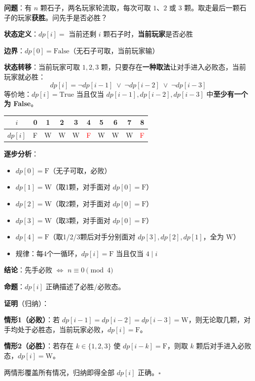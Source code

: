 \documentclass[12pt, a4paper]{ctexart}
\begin{document}
\begin{blackboard}

\textbf{问题}：有 $n$ 颗石子，两名玩家轮流取，每次可取 $1$、$2$ 或 $3$ 颗。取走最后一颗石子的玩家\textbf{获胜}。问先手是否必胜？

\textbf{状态定义}：$dp[i] = $ 当前还剩 $i$ 颗石子时，\textbf{当前玩家}是否必胜

\textbf{边界}：$dp[0] = \text{False}$（无石子可取，当前玩家输）

\textbf{状态转移}：当前玩家可取 $1, 2, 3$ 颗，只要存在\textbf{一种取法}让对手进入必败态，当前玩家就必胜：
\[
dp[i] = \lnot dp[i-1] \;\lor\; \lnot dp[i-2] \;\lor\; \lnot dp[i-3]
\]
等价地：$dp[i] = \text{True}$ 当且仅当 $dp[i-1], dp[i-2], dp[i-3]$ 中\textbf{至少有一个为 False}。

\end{blackboard}

\begin{blackboard}

\begin{center}
\begin{tabular}{c|ccccccccc}
$i$ & 0 & 1 & 2 & 3 & 4 & 5 & 6 & 7 & 8 \\
\hline
$dp[i]$ & F & W & W & W & \textcolor{red}{F} & W & W & W & \textcolor{red}{F} \\
\end{tabular}
\end{center}

\textbf{逐步分析}：
\begin{itemize}
    \item $dp[0] = \text{F}$（无子可取，必败）
    \item $dp[1] = \text{W}$（取1颗，对手面对 $dp[0]=\text{F}$）
    \item $dp[2] = \text{W}$（取2颗，对手面对 $dp[0]=\text{F}$）
    \item $dp[3] = \text{W}$（取3颗，对手面对 $dp[0]=\text{F}$）
    \item $dp[4] = \text{F}$（取1/2/3颗后对手分别面对 $dp[3],dp[2],dp[1]$，全为 W）
    \item 规律：每4个一循环，$dp[i] = \text{F}$ 当且仅当 $4 \mid i$
\end{itemize}

\textbf{结论}：先手必败 $\Longleftrightarrow$ $n \equiv 0 \pmod{4}$

\end{blackboard}

\begin{blackboard}

\textbf{命题}：$dp[i]$ 正确描述了必胜/必败态。

\textbf{证明}（归纳）：

\textbf{情形1（必败）}：若 $dp[i-1] = dp[i-2] = dp[i-3] = \text{W}$，则无论取几颗，对手均处于必胜态，当前玩家必败，$dp[i] = \text{F}$。

\textbf{情形2（必胜）}：若存在 $k \in \{1,2,3\}$ 使 $dp[i-k] = \text{F}$，则取 $k$ 颗后对手进入必败态，$dp[i] = \text{W}$。

两情形覆盖所有情况，归纳即得全部 $dp[i]$ 正确。$\square$

\end{blackboard}
\end{document}
